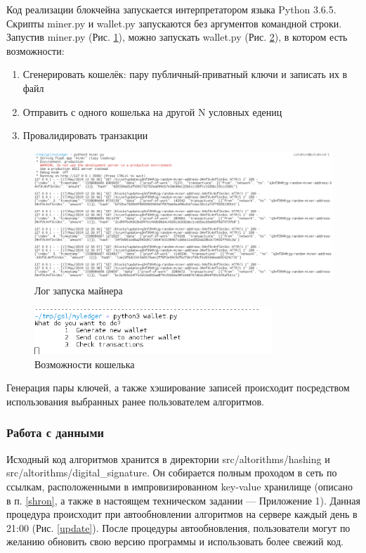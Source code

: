Код реализации блокчейна запускается интерпретатором языка Python 3.6.5.
Скрипты {\small miner.py} и {\small wallet.py} запускаются без аргументов
командной строки. Запустив {\small miner.py} (Рис. \ref{miner_run}), можно запускать {\small
wallet.py} (Рис. \ref{wallet_run}), в котором есть возможности:
\begin{enumerate}
    \item Сгенерировать кошелёк: пару публичный-приватный ключи и записать их в файл
    \item Отправить с одного кошелька на другой N условных едениц
    \item Провалидировать транзакции
\end{enumerate}

\begin{figure}[h]
    \centering
    \includegraphics[width=\textwidth]{images/miner_run}
    \caption{Лог запуска майнера}\label{miner_run}
\end{figure}

\begin{figure}[h]
    \centering
    \includegraphics[width=0.8\textwidth]{images/wallet_run}
    \caption{Возможности кошелька}\label{wallet_run}
\end{figure}

Генерация пары ключей, а также хэширование записей происходит посредством
использования выбранных ранее пользователем алгоритмов.

\newpage
\subsubsection{Работа с данными}\label{dannie_sheme}
Исходный код алгоритмов хранится в директории {\small src/altorithms/hashing} и
{\small src/altorithms/digital\_signature}. Он собирается полным проходом в
сеть по ссылкам, расположенными в импровизированном key-value хранилище
(описано в п. \ref{shron}, а также в настоящем техническом задании ---
Приложение 1).
Данная процедура происходит при автообновлении алгоритмов
на сервере каждый день в 21:00 (Рис. \ref{update}). После процедуры
автообновления, пользователи могут по желанию обновить свою версию программы и
использовать более свежий код.

